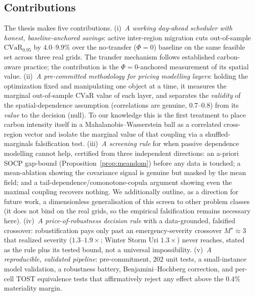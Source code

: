 \documentclass[10pt,twocolumn]{article}
\newcommand{\CVaR}{\mathrm{CVaR}}
\begin{document}
\subsection{Contributions}
The thesis makes five contributions. (i)~\emph{A working day-ahead scheduler with
honest, baseline-anchored savings}: active inter-region migration cuts out-of-sample
$\CVaR_{0.95}$ by $4.0$--$9.9\%$ over the no-transfer ($\Phi=0$) baseline on the same
feasible set across three real grids. The transfer mechanism follows established
carbon-aware practice; the contribution is the $\Phi=0$-anchored measurement of its
spatial value. (ii)~\emph{A pre-committed methodology for pricing modelling layers}:
holding the optimization fixed and manipulating one object at a time, it measures the
marginal out-of-sample $\CVaR$ value of each layer, and separates the \emph{validity}
of the spatial-dependence assumption (correlations are genuine, $0.7$--$0.8$) from its
\emph{value} to the decision (null). To our knowledge this is the first treatment to
place carbon intensity itself in a Mahalanobis--Wasserstein ball as a correlated
cross-region vector and isolate the marginal value of that coupling via a
shuffled-marginals falsification test. (iii)~\emph{A screening rule} for when passive
dependence modelling cannot help, certified from three independent directions: an
a-priori SOCP gap-bound (Proposition~\ref{prop:meandom}) before any data is touched; a
mean-ablation showing the covariance signal is genuine but masked by the mean field;
and a tail-dependence/comonotone-copula argument showing even the maximal coupling
recovers nothing. We additionally outline, as a direction for future work, a
dimensionless generalisation of this screen to other problem classes (it does not bind
on the real grids, so the empirical falsification remains necessary here). (iv)~\emph{A price-of-robustness
decision rule} with a data-grounded, falsified crossover: robustification pays only
past an emergency-severity crossover $M^\star\approx3$ that realized severity
($1.3$--$1.9\times$; Winter Storm Uri $1.3\times$) never reaches, stated as the rule
plus its tested bound, not a universal impossibility. (v)~\emph{A reproducible,
validated pipeline}: pre-commitment, $202$ unit tests, a small-instance model
validation, a robustness battery, Benjamini--Hochberg correction, and per-cell TOST
equivalence tests that affirmatively reject any effect above the $0.4\%$ materiality
margin.
\end{document}
